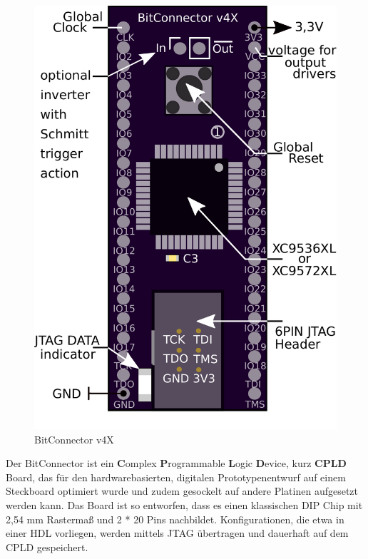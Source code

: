 \documentclass{article}
\begin{document}
\vspace{0.5cm}


\begin{figure}
		\vspace { -15pt }
	\includegraphics[scale=0.3]{BitConnector6P} 
	\caption{BitConnector v4X}
	\label{fig:}
\end{figure}

Der BitConnector ist ein \textbf{C}omplex \textbf{P}rogrammable \textbf{L}ogic \textbf{D}evice, kurz \textbf{CPLD} Board, das für den  hardwarebasierten, digitalen Prototypenentwurf auf einem Steckboard optimiert wurde und zudem gesockelt auf andere Platinen aufgesetzt werden kann. Das Board ist so entworfen, dass es einen klassischen DIP Chip mit 2,54 mm Rastermaß und 2 * 20 Pins nachbildet. Konfigurationen, die etwa in einer HDL vorliegen, werden mittels JTAG übertragen und dauerhaft auf dem CPLD gespeichert.
 
\end{document}
